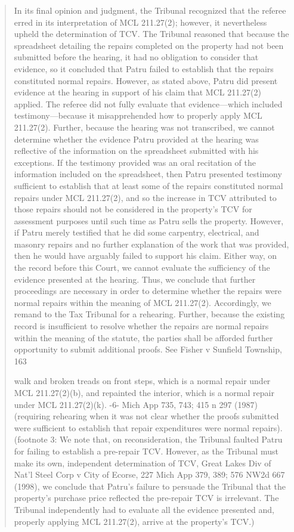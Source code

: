 \documentclass[12pt,\documentclassflag]{michiganCourtOfAppealsBrief}
\begin{document}
\begin{quotation}
  In its final opinion and judgment, the Tribunal recognized that the referee erred in its
interpretation of MCL 211.27(2); however, it nevertheless upheld the determination of TCV.
The Tribunal reasoned that because the spreadsheet detailing the repairs completed on the
property had not been submitted before the hearing, it had no obligation to consider that
evidence, so it concluded that Patru failed to establish that the repairs constituted normal repairs.
However, as stated above, Patru did present evidence at the hearing in support of his claim that
MCL 211.27(2) applied. The referee did not fully evaluate that evidence—which included
testimony—because it misapprehended how to properly apply MCL 211.27(2).
Further, because the hearing was not transcribed, we cannot determine whether the
evidence Patru provided at the hearing was reflective of the information on the spreadsheet
submitted with his exceptions. If the testimony provided was an oral recitation of the
information included on the spreadsheet, then Patru presented testimony sufficient to establish
that at least some of the repairs constituted normal repairs under MCL 211.27(2), and so the
increase in TCV attributed to those repairs should not be considered in the property's TCV for
assessment purposes until such time as Patru sells the property. However, if Patru merely
testified that he did some carpentry, electrical, and masonry repairs and no further explanation of
the work that was provided, then he would have arguably failed to support his claim. Either way,
on the record before this Court, we cannot evaluate the sufficiency of the evidence presented at
the hearing. Thus, we conclude that further proceedings are necessary in order to determine
whether the repairs were normal repairs within the meaning of MCL 211.27(2). Accordingly, we
remand to the Tax Tribunal for a rehearing. Further, because the existing record is insufficient to
resolve whether the repairs are normal repairs within the meaning of the statute, the parties shall
be afforded further opportunity to submit additional proofs. See Fisher v Sunfield Township, 163

walk and broken treads on front steps, which is a normal repair under MCL 211.27(2)(b), and
repainted the interior, which is a normal repair under MCL 211.27(2)(k).
-6-
Mich App 735, 743; 415 n 297 (1987) (requiring rehearing when it was not clear whether the
proofs submitted were sufficient to establish that repair expenditures were normal repairs).
(footnote 3: We note that, on reconsideration, the Tribunal faulted Patru for failing to establish a pre-repair
TCV. However, as the Tribunal must make its own, independent determination of TCV, Great
Lakes Div of Nat'l Steel Corp v City of Ecorse, 227 Mich App 379, 389; 576 NW2d 667 (1998),
we conclude that Patru's failure to persuade the Tribunal that the property's purchase price
reflected the pre-repair TCV is irrelevant. The Tribunal independently had to evaluate all the
evidence presented and, properly applying MCL 211.27(2), arrive at the property's TCV.)
\end{quotation}
\end{document}

